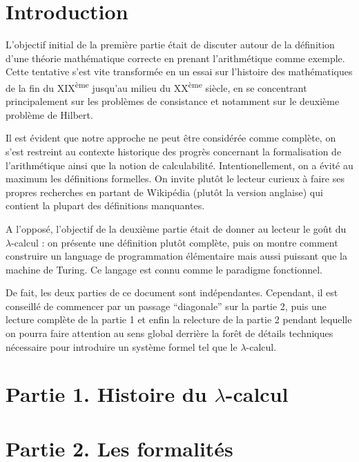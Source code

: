 \documentclass[12pt, a4paper]{article}
\begin{document}
	
\section*{Introduction}
L'objectif initial de la première partie était de discuter autour de la définition d'une théorie mathématique correcte en prenant l'arithmétique comme exemple. Cette tentative s'est vite transformée en un essai sur l'histoire des mathématiques de la fin du XIX\textsuperscript{ème} jusqu'au milieu du XX\textsuperscript{ème} siècle, en se concentrant principalement sur les problèmes de consistance et notamment sur le deuxième problème de Hilbert.

Il est évident que notre approche ne peut être considérée comme complète, on s'est restreint au contexte historique des progrès concernant la formalisation de l'arithmétique ainsi que la notion de calculabilité. Intentionellement, on a évité au maximum les définitions formelles. On invite plutôt le lecteur curieux à faire ses propres recherches en partant de Wikipédia (plutôt la version anglaise) qui contient la plupart des définitions manquantes.

A l'opposé, l'objectif de la deuxième partie était de donner au lecteur le goût du $\lambda$-calcul : on présente une définition plutôt complète, puis on montre comment construire un language de programmation élémentaire mais aussi puissant que la machine de Turing. Ce langage est connu comme le paradigme fonctionnel.

De fait, les deux parties de ce document sont indépendantes. Cependant, il est conseillé de commencer par un passage ``diagonale'' sur la partie 2, puis une lecture complète de la partie 1 et enfin la relecture de la partie 2 pendant lequelle on pourra faire attention au sens global derrière la forêt de détails techniques nécessaire pour introduire un système formel tel que le $\lambda$-calcul.
	
\section*{Partie 1. Histoire du $\lambda$-calcul}


\newpage
\section*{Partie 2. Les formalités}

\end{document}
